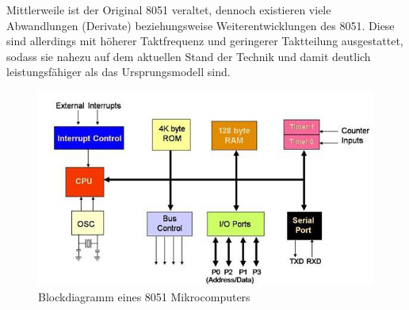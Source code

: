 Mittlerweile ist der Original 8051 veraltet, dennoch existieren viele Abwandlungen (Derivate) beziehungsweise Weiterentwicklungen des 8051. Diese sind allerdings mit höherer Taktfrequenz und geringerer Taktteilung ausgestattet, sodass sie nahezu auf dem aktuellen Stand der Technik und damit deutlich leistungsfähiger als das Ursprungsmodell sind.\cite{bib:8051_2}

\begin{figure}[htbp]
	\centering
	\includegraphics[scale=0.75]{img/8051-diagram}
	\caption{Blockdiagramm eines 8051 Mikrocomputers}
	\label{img:8051}
\end{figure}
